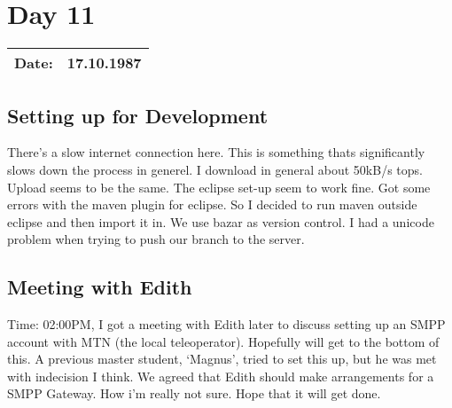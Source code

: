 \section{Day 11}
\begin{tabular}{|c|c|}
\hline
Date: & 17.10.1987 \\
\hline
\end{tabular}
\subsection{Setting up for Development}
There's a slow internet connection here. This is something thats significantly slows down the process in generel. I download in general about 50kB/s tops. Upload seems to be the same. The eclipse set-up seem to work fine. Got some errors with the maven plugin for eclipse. So I decided to run maven outside eclipse and then import it in. We use bazar as version control. I had a unicode problem when trying to push our branch to the server.
\subsection{Meeting with Edith}
Time: 02:00PM, I got a meeting with Edith later to discuss setting up an SMPP account with MTN (the local teleoperator). Hopefully will get to the bottom of this. A previous master student, `Magnus', tried to set this up, but he was met with indecision I think. We agreed that Edith should make arrangements for a SMPP Gateway. How i'm really not sure. Hope that it will get done.

